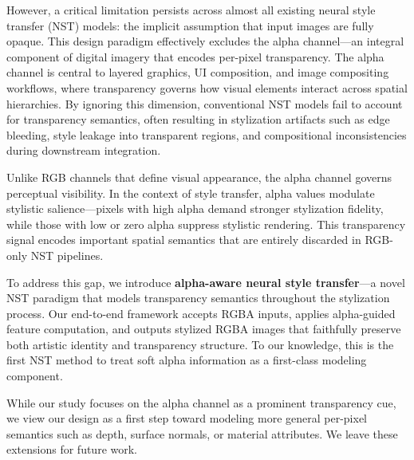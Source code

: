 \documentclass[letterpaper]{article} %
\begin{document}
However, a critical limitation persists across almost all existing neural style transfer (NST) models: the implicit assumption that input images are fully opaque. This design paradigm effectively excludes the alpha channel—an integral component of digital imagery that encodes per-pixel transparency. The alpha channel is central to layered graphics, UI composition, and image compositing workflows, where transparency governs how visual elements interact across spatial hierarchies. By ignoring this dimension, conventional NST models fail to account for transparency semantics, often resulting in stylization artifacts such as edge bleeding, style leakage into transparent regions, and compositional inconsistencies during downstream integration.

Unlike RGB channels that define visual appearance, the alpha channel governs perceptual visibility. In the context of style transfer, alpha values modulate stylistic salience—pixels with high alpha demand stronger stylization fidelity, while those with low or zero alpha suppress stylistic rendering. This transparency signal encodes important spatial semantics that are entirely discarded in RGB-only NST pipelines.

To address this gap, we introduce \textbf{alpha-aware neural style transfer}—a novel NST paradigm that models transparency semantics throughout the stylization process. Our end-to-end framework accepts RGBA inputs, applies alpha-guided feature computation, and outputs stylized RGBA images that faithfully preserve both artistic identity and transparency structure. To our knowledge, this is the first NST method to treat soft alpha information as a first-class modeling component.

While our study focuses on the alpha channel as a prominent transparency cue, we view our design as a first step toward modeling more general per-pixel semantics such as depth, surface normals, or material attributes. We leave these extensions for future work.
\end{document}
